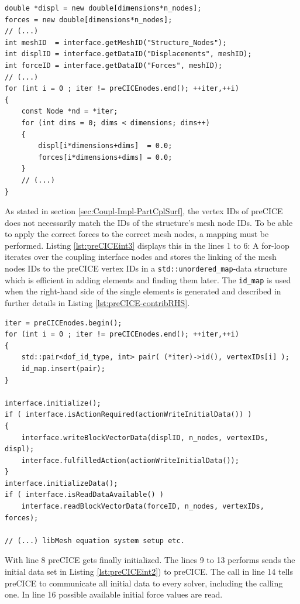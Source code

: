 \begin{lstlisting}[caption=preCICE Integration Part 2,label=lst:preCICEint2,keepspaces=true]
double *displ = new double[dimensions*n_nodes];
forces = new double[dimensions*n_nodes];
// (...)
int meshID  = interface.getMeshID("Structure_Nodes");
int displID = interface.getDataID("Displacements", meshID);
int forceID = interface.getDataID("Forces", meshID);
// (...)
for (int i = 0 ; iter != preCICEnodes.end(); ++iter,++i)
{
	const Node *nd = *iter;
	for (int dims = 0; dims < dimensions; dims++)
	{
		displ[i*dimensions+dims]  = 0.0;
		forces[i*dimensions+dims] = 0.0;
	}
	// (...)
}
\end{lstlisting}
   As stated in section \ref{sec:Coupl-Impl-PartCplSurf}, the vertex IDs of preCICE does not necessarily match the IDs of the structure's mesh node IDs. To be able to apply the correct forces to the correct mesh nodes, a mapping must be performed. Listing \ref{lst:preCICEint3} displays this in the lines 1 to 6: A for-loop iterates over the coupling interface nodes and stores the linking of the mesh nodes IDs to the preCICE vertex IDs in a \texttt{std::unordered\_map}-data structure which is efficient in adding elements and finding them later. The \texttt{id\_map} is used when the right-hand side of the single elements is generated and described in further details in Listing \ref{lst:preCICE-contribRHS}.

\begin{lstlisting}[caption=preCICE Integration Part 3,label=lst:preCICEint3,keepspaces=true]
iter = preCICEnodes.begin();
for (int i = 0 ; iter != preCICEnodes.end(); ++iter,++i)
{
	std::pair<dof_id_type, int> pair( (*iter)->id(), vertexIDs[i] );
	id_map.insert(pair);
}

interface.initialize();
if ( interface.isActionRequired(actionWriteInitialData()) )
{
	interface.writeBlockVectorData(displID, n_nodes, vertexIDs, displ);
	interface.fulfilledAction(actionWriteInitialData());
}
interface.initializeData();
if ( interface.isReadDataAvailable() )
	interface.readBlockVectorData(forceID, n_nodes, vertexIDs, forces);

// (...) libMesh equation system setup etc.
\end{lstlisting}
   With line 8 preCICE gets finally initialized. The lines 9 to 13 performs sends the initial data set in Listing \ref{lst:preCICEint2}) to preCICE. The call in line 14 tells preCICE to communicate all initial data to every solver, including the calling one. In line 16 possible available initial force values are read.
   
